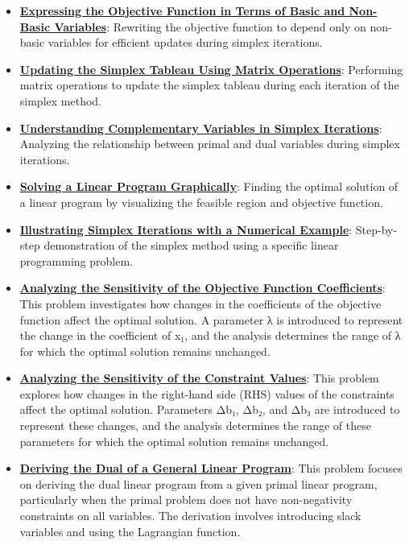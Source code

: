 \documentclass{article}%
\begin{document}
\begin{itemize}[leftmargin=*]
\item \href{https://www.math.purdue.edu/~yipn/421/2024-09-24-SimplexMatrix.pdf#page=8}{\textbf{Expressing the Objective Function in Terms of Basic and Non{-}Basic Variables}}: Rewriting the objective function to depend only on non-basic variables for efficient updates during simplex iterations. %
\item \href{https://www.math.purdue.edu/~yipn/421/2024-09-24-SimplexMatrix.pdf#page=10}{\textbf{Updating the Simplex Tableau Using Matrix Operations}}: Performing matrix operations to update the simplex tableau during each iteration of the simplex method. %
\item \href{https://www.math.purdue.edu/~yipn/421/2024-09-24-SimplexMatrix.pdf#page=14}{\textbf{Understanding Complementary Variables in Simplex Iterations}}: Analyzing the relationship between primal and dual variables during simplex iterations. %
\item \href{https://www.math.purdue.edu/~yipn/421/2024-09-24-SimplexMatrix.pdf#page=16}{\textbf{Solving a Linear Program Graphically}}: Finding the optimal solution of a linear program by visualizing the feasible region and objective function. %
\item \href{https://www.math.purdue.edu/~yipn/421/2024-09-24-SimplexMatrix.pdf#page=15}{\textbf{Illustrating Simplex Iterations with a Numerical Example}}: Step-by-step demonstration of the simplex method using a specific linear programming problem. %
\item \href{https://www.math.purdue.edu/~yipn/421/2024-09-26-Sensitivity.pdf#page=4}{\textbf{Analyzing the Sensitivity of the Objective Function Coefficients}}: This problem investigates how changes in the coefficients of the objective function affect the optimal solution. A parameter λ is introduced to represent the change in the coefficient of x₁, and the analysis determines the range of λ for which the optimal solution remains unchanged. %
\item \href{https://www.math.purdue.edu/~yipn/421/2024-09-26-Sensitivity.pdf#page=8}{\textbf{Analyzing the Sensitivity of the Constraint Values}}: This problem explores how changes in the right-hand side (RHS) values of the constraints affect the optimal solution. Parameters Δb₁, Δb₂, and Δb₃ are introduced to represent these changes, and the analysis determines the range of these parameters for which the optimal solution remains unchanged. %
\item \href{https://www.math.purdue.edu/~yipn/421/2024-10-01-DualGeneralLP.pdf#page=1}{\textbf{Deriving the Dual of a General Linear Program}}: This problem focuses on deriving the dual linear program from a given primal linear program, particularly when the primal problem does not have non-negativity constraints on all variables. The derivation involves introducing slack variables and using the Lagrangian function. %

\end{itemize}
\end{document}
